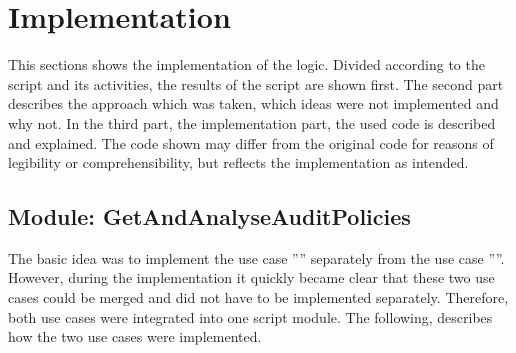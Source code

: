 \section{Implementation}
This sections shows the implementation of the logic. Divided according to the script and its activities, the results of the script are shown first. The second part describes the approach which was taken, which ideas were not implemented and why not. In the third part, the implementation part, the used code is described and explained. The code shown may differ from the original code for reasons of legibility or comprehensibility, but reflects the implementation as intended.
\subsection{Module: GetAndAnalyseAuditPolicies}
The basic idea was to implement the use case '''' separately from the use case ''''. However, during the implementation it quickly became clear that these two use cases could be merged and did not have to be implemented separately. Therefore, both use cases were integrated into one script module. The following, describes how the two use cases were implemented.

